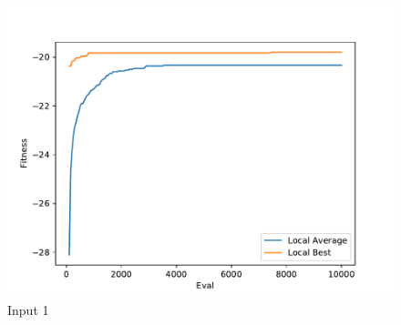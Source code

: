 \documentclass{standalone}
\begin{document}
\begin{figure}[!htb]
	\caption{Input 1}
	\label{fig:graph_1035}
	\includegraphics[width=\textwidth]{../graphs/graphs/1035.pdf}
\end{figure}
\end{document}

